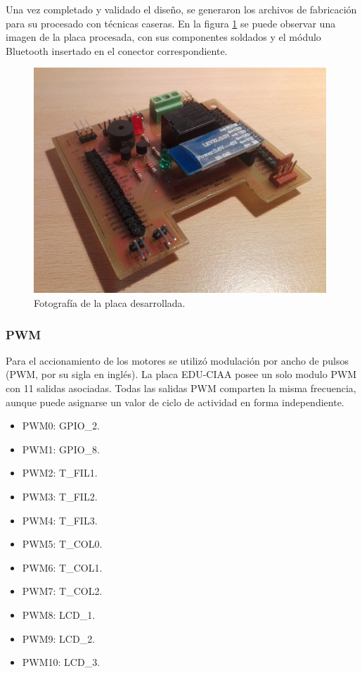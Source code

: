 \pagebreak

Una vez completado y validado el diseño, se generaron los archivos de fabricación para su procesado con técnicas caseras. 
En la figura \ref{fig:placafoto1} se puede observar una  imagen de la placa procesada, con sus componentes soldados y el módulo Bluetooth insertado en el conector correspondiente.


\begin{figure}[h]
	\centering
	\includegraphics[width=11cm]{./Figures/placafoto.png}
	\caption{Fotografía de la placa desarrollada.}
	\label{fig:placafoto1}
\end{figure}

		\subsubsection{PWM}

Para el accionamiento de los motores se utilizó modulación por ancho de pulsos (PWM, por su sigla en inglés). La placa EDU-CIAA posee un solo modulo PWM con 11 salidas asociadas. Todas las salidas PWM comparten la misma frecuencia, aunque puede asignarse un valor de ciclo de actividad en forma independiente.

\begin{itemize}
	\item PWM0:  GPIO\_2.
	\item PWM1:  GPIO\_8.
	\item PWM2:  T\_FIL1.
	\item PWM3:  T\_FIL2.
	\item PWM4:  T\_FIL3.
	\item PWM5:  T\_COL0.
	\item PWM6:  T\_COL1.
	\item PWM7:  T\_COL2.
	\item PWM8:  LCD\_1.
	\item PWM9:  LCD\_2.		
	\item PWM10: LCD\_3.				
\end{itemize}

